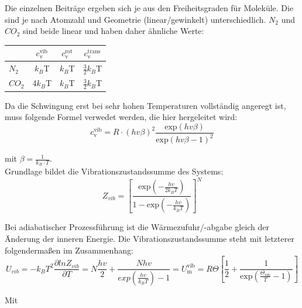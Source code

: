 \documentclass[12pt,a4paper,titlepage,headinclude,bibtotoc]{scrartcl}
\begin{document}
Die einzelnen Beiträge ergeben sich je aus den Freiheitsgraden für Moleküle. Die sind je nach Atomzahl und Geometrie (linear/gewinkelt) unterschiedlich. $N_2$ und $CO_2$ sind beide linear und haben daher ähnliche Werte:\\


\begin{table} [h]
\begin{tabular} {l | c|  c | c}
	 & $c_\mathrm{v}^\mathrm{ vib}$  & $c_\mathrm{v}^\mathrm{ rot}$ & $c_\mathrm{v}^\mathrm{trans}$\\
	 \hline
	 $N_2$ & $k_B$T & $k_B$T &$\frac{3}{2}k_B$T\\
	  $CO_2$ & 4$k_B$T & $k_B$T &$\frac{3}{2}k_B$T\\
\end{tabular}
\end{table}

Da die Schwingung erst bei sehr hohen Temperaturen vollständig angeregt ist, muss folgende Formel verwedet werden, die hier hergeleitet wird: \\


\begin{equation}
c_\mathrm{v}^\mathrm{ vib} = R\cdot(hv\beta)^2 \frac{\mathrm{exp}(hv\beta)}{\mathrm{exp}(hv\beta -1)^2}
\end{equation}


mit $\beta=\frac{1}{k_{B} \cdot T}$.\\

Grundlage bildet die Vibrationszustandssumme des Systems:\\

\begin{equation}
Z_{vib}= \left[\frac{\mathrm{exp}(-\frac{hv}{2k_BT})}{1-\mathrm{exp}(-\frac{hv}{k_BT})}\right]^N
\end{equation}

Bei adiabatischer Prozessführung ist die Wärmezufuhr/-abgabe gleich der Änderung der inneren Energie. Die Vibrationszustandssumme steht mit letzterer folgendermaßen im Zusammenhang:\\

\begin{equation}
U_{vib}= -k_BT^2 \frac{\partial lnZ_{vib}}{\partial T} = N\frac{hv}{2} +\frac{Nhv}{exp\left(\frac{hv}{k_BT}\right)-1}= U_\mathrm{m}^\mathrm{vib} = R \Theta \left[ \frac{1}{2} + \frac{1}{\mathrm{exp}(\frac{\Theta_\mathrm{vib}}{T} -1)}\right]
\end{equation}

Mit\\
\end{document}
